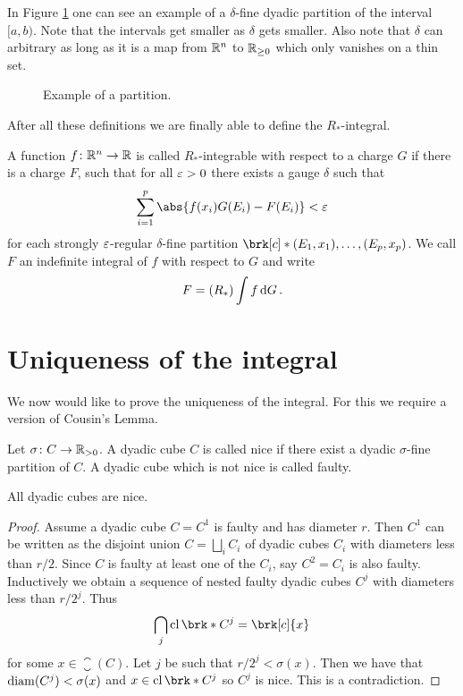 In Figure \ref{fi:Partition} one can see an example of a $\delta$-fine dyadic partition of the interval $[a,b)$. Note that the intervals get smaller as $\delta$ gets smaller. Also note that $\delta$ can arbitrary as long as it is a map from $\mathbb{R}^n$ to $\mathbb{R}_{\geq0}$ which only vanishes on a thin set.


\begin{figure}
\centering

\caption{Example of a partition.}
\label{fi:Partition}
\end{figure}

After all these definitions we are finally able to define the $R_*$-integral.

\begin{definition}[$R_*$-integral]
A function $f\colon \mathbb{R}^n\to\mathbb{R}$ is called $R_*$-integrable with respect to a charge $G$ if there is a charge $F$, such that for all $\varepsilon>0$ there exists a gauge $\delta$ such that
\begin{align*}
	\sum_{i=1}^p\abs{f(x_i)G(E_i)-F(E_i)}<\e
\end{align*}
for each strongly $\varepsilon$-regular $\delta$-fine partition $\brk[c]*{(E_1,x_1),\dots,(E_p,x_p)}$. We call $F$ an indefinite integral of $f$ with respect to $G$ and write
\begin{align*}
	F=(R_*)\int f\,\mathrm{d} G\,.
\end{align*}
\end{definition}


\section*{Uniqueness of the integral}

We now would like to prove the uniqueness of the integral. For this we require a version of Cousin's Lemma.

\begin{definition}
Let $\sigma\colon C\to\mathbb{R}_{>0}$. A dyadic cube $C$ is called nice if there exist a dyadic $\sigma$-fine partition of $C$.
A dyadic cube which is not nice is called faulty.
\end{definition}

\begin{lemma}[Cousin]\label{le:Cousin}
All dyadic cubes are nice.
\end{lemma}
\begin{proof}
Assume a dyadic cube $C=C^1$ is faulty and has diameter $r$. Then $C^1$ can be written as the disjoint union $C=\bigsqcup_iC_i$ of dyadic cubes $C_i$ with diameters less than $r/2$. Since $C$ is faulty at least one of the $C_i$, say $C^2=C_i$ is also faulty. Inductively we obtain a sequence of nested faulty dyadic cubes $C^j$ with diameters less than $r/2^j$. Thus
\begin{align*}
	\bigcap_j\closure\brk*{C^j}=\brk[c]{x}
\end{align*}
for some $x\in \closure(C)$. Let $j$ be such that $r/2^j<\sigma(x)$. Then we have that $\operatorname{diam}(C^j)<\sigma(x)$ and $x\in \closure\brk*{C^j}$ so $C^j$ is nice. This is a contradiction.
\end{proof}

